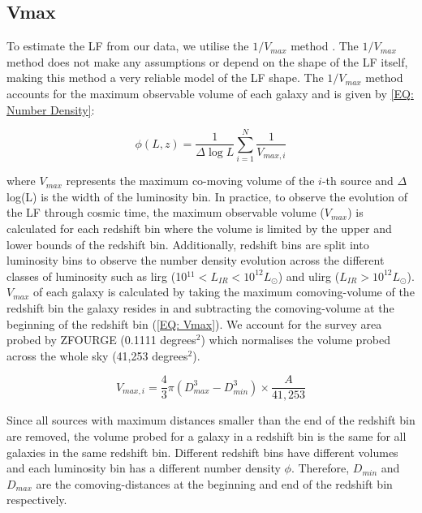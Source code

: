 \subsection{Vmax}
To estimate the LF from our data, we utilise the $1/V_{max}$ method \citep{schmidt_space_1968}. The $1/V_{max}$ method does not make any assumptions or depend on the shape of the LF itself, making this method a very reliable model of the LF shape. The $1/V_{max}$ method accounts for the maximum observable volume of each galaxy and is given by \cref{EQ: Number Density}:

\begin{equation}
    \label{EQ: Number Density}
    \phi(L,z) = \frac{1}{\Delta \log L}\sum_{i=1}^N \frac{1}{V_{max,i}}
\end{equation}

where $V_{max}$ represents the maximum co-moving volume of the $i$-th source and $\Delta$ log(L) is the width of the luminosity bin. In practice, to observe the evolution of the LF through cosmic time, the maximum observable volume ($V_{max}$) is calculated for each redshift bin where the volume is limited by the upper and lower bounds of the redshift bin. Additionally, redshift bins are split into luminosity bins to observe the number density evolution across the different classes of luminosity such as \gls{lirg} (10$^{11} < L_{IR} < 10^{12} L_{\odot}$) and \gls{ulirg} ($L_{IR} > 10^{12} L_{\odot}$). $V_{max}$ of each galaxy is calculated by taking the maximum comoving-volume of the redshift bin the galaxy resides in and subtracting the comoving-volume at the beginning of the redshift bin (\cref{EQ: Vmax}). We account for the survey area probed by ZFOURGE (0.1111 degrees$^2$) which normalises the volume probed across the whole sky (41,253 degrees$^2$). 

\begin{equation}
    \label{EQ: Vmax}
    V_{max,i} = \frac{4}{3} \pi \left(D_{max}^3 - D_{min}^3\right) \times \frac{A}{41,253}
\end{equation}

Since all sources with maximum distances smaller than the end of the redshift bin are removed, the volume probed for a galaxy in a redshift bin is the same for all galaxies in the same redshift bin. Different redshift bins have different volumes and each luminosity bin has a different number density $\phi$. Therefore, $D_{min}$ and $D_{max}$ are the comoving-distances at the beginning and end of the redshift bin respectively. 

